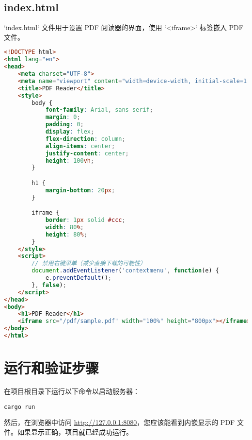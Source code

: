 \documentclass{article}
\begin{document}
\subsection{index.html}
`index.html` 文件用于设置 PDF 阅读器的界面，使用 `<iframe>` 标签嵌入 PDF 文件。

\begin{lstlisting}[language=html, caption=index.html]
<!DOCTYPE html>
<html lang="en">
<head>
    <meta charset="UTF-8">
    <meta name="viewport" content="width=device-width, initial-scale=1.0">
    <title>PDF Reader</title>
    <style>
        body {
            font-family: Arial, sans-serif;
            margin: 0;
            padding: 0;
            display: flex;
            flex-direction: column;
            align-items: center;
            justify-content: center;
            height: 100vh;
        }

        h1 {
            margin-bottom: 20px;
        }

        iframe {
            border: 1px solid #ccc;
            width: 80%;
            height: 80%;
        }
    </style>
    <script>
        // 禁用右键菜单（减少直接下载的可能性）
        document.addEventListener('contextmenu', function(e) {
            e.preventDefault();
        }, false);
    </script>
</head>
<body>
    <h1>PDF Reader</h1>
    <iframe src="/pdf/sample.pdf" width="100%" height="800px"></iframe>
</body>
</html>
\end{lstlisting}

\section{运行和验证步骤}
在项目根目录下运行以下命令以启动服务器：

\begin{verbatim}
cargo run
\end{verbatim}

然后，在浏览器中访问 \url{http://127.0.0.1:8080}，您应该能看到内嵌显示的 PDF 文件。如果显示正确，项目就已经成功运行。
\end{document}
